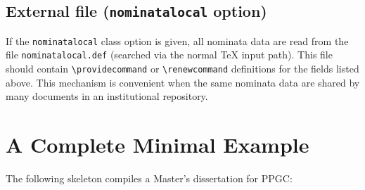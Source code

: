 \documentclass[11pt,a4paper]{article}
\newcommand{\opt}[1]{\texttt{#1}}
\newcommand{\cmd}[1]{\texttt{\textbackslash #1}}
\newcommand{\file}[1]{\texttt{#1}}
\begin{document}
\subsection{External file (\opt{nominatalocal} option)}

If the \opt{nominatalocal} class option is given, all nominata data
are read from the file \file{nominatalocal.def} (searched via the
normal \TeX{} input path).  This file should contain
\cmd{providecommand} or \cmd{renewcommand} definitions for the fields
listed above.  This mechanism is convenient when the same nominata
data are shared by many documents in an institutional repository.

\section{A Complete Minimal Example}
\label{sec:example}

The following skeleton compiles a Master's dissertation for PPGC:
\end{document}
